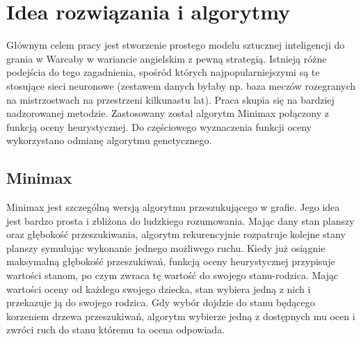 \chapter{Idea rozwiązania i algorytmy}
\thispagestyle{chapterBeginStyle}
\label{rozdzial2}



Głównym celem pracy jest stworzenie prostego modelu sztucznej inteligencji do grania w Warcaby w wariancie angielskim z pewną strategią. Istnieją różne podejścia do tego zagadnienia, spośród których najpopularniejszymi są te stosujące sieci neuronowe (zestawem danych byłaby np. baza meczów rozegranych na mistrzostwach na przestrzeni kilkunastu lat). Praca skupia się na bardziej nadzorowanej metodzie. Zastosowany został algorytm Minimax połączony z funkcją oceny heurystycznej. Do częściowego wyznaczenia funkcji oceny wykorzystano odmianę algorytmu genetycznego.

\section{Minimax}

Minimax jest szczególną wersją algorytmu przeszukującego w grafie. Jego idea jest bardzo prosta i zbliżona do ludzkiego rozumowania. Mając dany stan planszy oraz głębokość przeszukiwania, algorytm rekurencyjnie rozpatruje kolejne stany planszy symulując wykonanie jednego możliwego ruchu. Kiedy już osiągnie maksymalną głębokość przeszukiwań, funkcją oceny heurystycznej przypisuje wartości stanom, po czym zwraca tę wartość do swojego stanu-rodzica. Mając wartości oceny od każdego swojego dziecka, stan wybiera jedną z nich i przekazuje ją do swojego rodzica. Gdy wybór dojdzie do stanu będącego korzeniem drzewa przeszukiwań, algorytm wybierze jedną z dostępnych mu ocen i zwróci ruch do stanu któremu ta ocena odpowiada.

